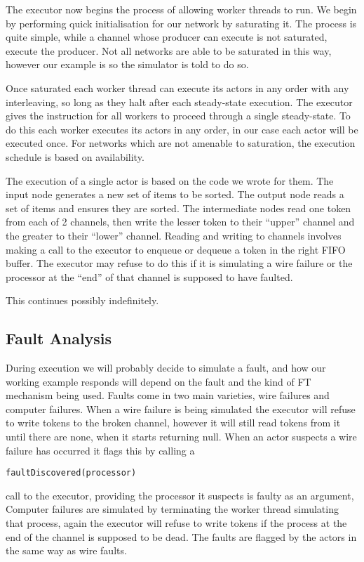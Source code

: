 The executor now begins the process of allowing worker threads to run.
We begin by performing quick initialisation for our network by saturating it.
The process is quite simple, while a channel whose producer can execute is not saturated, execute the producer.
Not all networks are able to be saturated in this way, however our example is so the simulator is told to do so.

Once saturated each worker thread can execute its actors in any order with any interleaving, so long as they halt after each steady-state execution.
The executor gives the instruction for all workers to proceed through a single steady-state.
To do this each worker executes its actors in any order, in our case each actor will be executed once.
For networks which are not amenable to saturation, the execution schedule is based on availability.

The execution of a single actor is based on the code we wrote for them.
The input node generates a new set of items to be sorted.
The output node reads a set of items and ensures they are sorted.
The intermediate nodes read one token from each of 2 channels, then write the lesser token to their ``upper'' channel and the greater to their ``lower'' channel.
Reading and writing to channels involves making a call to the executor to enqueue or dequeue a token in the right FIFO buffer.
The executor may refuse to do this if it is simulating a wire failure or the processor at the ``end'' of that channel is supposed to have faulted.

This continues possibly indefinitely.

\subsection{Fault Analysis}

During execution we will probably decide to simulate a fault, and how our working example responds will depend on the fault and the kind of FT mechanism being used.
Faults come in two main varieties, wire failures and computer failures.
When a wire failure is being simulated the executor will refuse to write tokens to the broken channel, however it will still read tokens from it until there are none, when it starts returning null.
When an actor suspects a wire failure has occurred it flags this by calling a \begin{verbatim}faultDiscovered(processor)\end{verbatim} call to the executor, providing the processor it suspects is faulty as an argument,
Computer failures are simulated by terminating the worker thread simulating that process, again the executor will refuse to write tokens if the process at the end of the channel is supposed to be dead.
The faults are flagged by the actors in the same way as wire faults.

